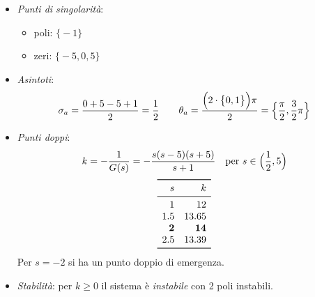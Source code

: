 \begin{esercizio}
\begin{itemize}
	\item \emph{Punti di singolarità}:
		\begin{itemize}
			\item poli: \(\bigl\{ -1 \bigr\}\)
			\item zeri: \(\bigl\{ -5,0,5 \bigr\}\)
		\end{itemize}
	\item \emph{Asintoti}:
		\[
			\sigma_a = \frac{0+5-5+1}{2} = \frac{1}{2} \qquad
			\theta_a = \frac{\Bigl(2\cdot \bigl\{0,1\bigr\}\Bigr)\pi}{2} = \Bigl\{ \frac{\pi}{2},\frac{3}{2}\pi \Bigr\}
		\]
	\item \emph{Punti doppi}:
		\[
			k = -\frac{1}{G(s)} = -\frac{s(s-5)(s+5)}{s+1} \quad
			\text{per } s \in \Bigl( \frac{1}{2},5 \Bigr)
		\]
		\[\begin{array}{rr}
			\toprule
			s 	&       k \\
			\midrule
			1 	&      12 \\
			1.5 	&   13.65 \\
			\bm{2} 	& \bm{14} \\
			2.5 	&   13.39 \\
			\bottomrule
		\end{array}\]
		Per \(s=-2\) si ha un punto doppio di emergenza.
	\item \emph{Stabilità}: per \(k \geq 0\) il sistema è \emph{instabile}
		con 2 poli instabili.
\end{itemize}
\end{esercizio}


